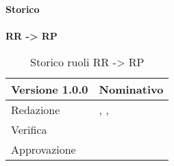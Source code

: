 \newpage
\Large{\textbf{Storico }}\\
\normalsize \\

\textbf{RR -> RP}
\label{tabVers1}
\begin{table}[h]
	\begin{tabular}{p{} p{}}
		\toprule \textbf{Versione 1.0.0}	&	\textbf{Nominativo}\\
		\midrule Redazione	& \FM, \TP, \VG\\
		\midrule Verifica &	\GP\\
		\midrule Approvazione	& \PM\\
		\bottomrule
	\end{tabular}
	\caption{Storico ruoli RR -> RP}
\end{table}